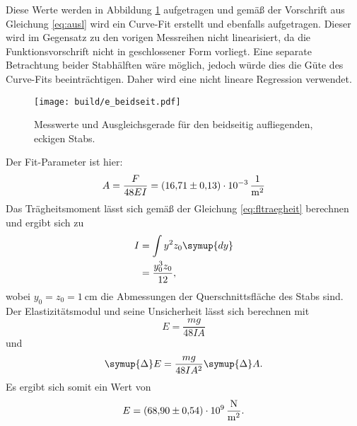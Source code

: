 \noindent Diese Werte werden in Abbildung \ref{fig:plot3} aufgetragen und gemäß der Vorschrift aus Gleichung \eqref{eq:ausl}
wird ein Curve-Fit erstellt und ebenfalls aufgetragen. Dieser wird im Gegensatz zu den vorigen
Messreihen nicht linearisiert, da die Funktionsvorschrift nicht in geschlossener Form vorliegt. Eine
separate Betrachtung beider Stabhälften wäre möglich, jedoch würde dies die Güte des Curve-Fits
beeinträchtigen. Daher wird eine nicht lineare Regression verwendet.
\begin{figure}[H]
    \centering
    \texttt{[image: build/e\_beidseit.pdf]}
    \caption{Messwerte und Ausgleichsgerade für den beidseitig aufliegenden, eckigen Stabs.}
    \label{fig:plot3}
\end{figure}
\noindent Der Fit-Parameter ist hier:
\begin{equation}
    A = \frac{F}{48EI} = \SI{16.71\pm0.13e-3}{\per\meter\squared}
\end{equation}
Das Trägheitsmoment lässt sich gemäß der Gleichung \eqref{eq:fltraegheit} berechnen und ergibt sich zu
\begin{align}
    I &= \int y^2z_0 \symup{dy} \\
      &= \frac{y_0^3z_0}{12},
\end{align}
wobei $y_0=z_0=\SI{1}{\centi\meter}$ die Abmessungen der Querschnittsfläche des Stabs sind.
Der Elastizitätsmodul und seine Unsicherheit lässt sich berechnen mit
\begin{equation}
    E=\frac{mg}{48IA}
\end{equation}
und
\begin{equation}
    \symup{\Delta}E=\frac{mg}{48IA^2}\symup{\Delta}A.
\end{equation}
Es ergibt sich somit ein Wert von
\begin{equation}
    E = \SI{68.90\pm0.54e9}{\newton\per\meter\squared}.
\end{equation}
